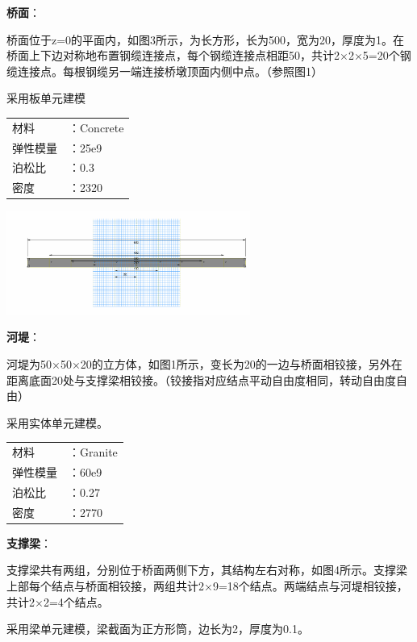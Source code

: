 \documentclass[UTF8]{ctexbook}
\begin{document}
\textbf{桥面}：

桥面位于z=0的平面内，如图3所示，为长方形，长为500，宽为20，厚度为1。在桥面上下边对称地布置钢缆连接点，每个钢缆连接点相距50，共计2×2×5=20个钢缆连接点。每根钢缆另一端连接桥墩顶面内侧中点。（参照图1）

采用板单元建模

\begin{center}
\begin{tabular}{ll}
材料&：Concrete\\
弹性模量&：25e9\\
泊松比&：0.3\\
密度&：2320\\
\end{tabular}
\end{center}
\begin{center}
\includegraphics[width=0.6\textwidth]{03.png}
\end{center}

\textbf{河堤}：

河堤为50×50×20的立方体，如图1所示，变长为20的一边与桥面相铰接，另外在距离底面20处与支撑梁相铰接。（铰接指对应结点平动自由度相同，转动自由度自由）

采用实体单元建模。

\begin{center}
\begin{tabular}{ll}
材料&：Granite\\
弹性模量&：60e9\\
泊松比&：0.27\\
密度&：2770\\
\end{tabular}
\end{center}

\textbf{支撑梁}：

支撑梁共有两组，分别位于桥面两侧下方，其结构左右对称，如图4所示。支撑梁上部每个结点与桥面相铰接，两组共计2×9=18个结点。两端结点与河堤相铰接，共计2×2=4个结点。

采用梁单元建模，梁截面为正方形筒，边长为2，厚度为0.1。
\end{document}
